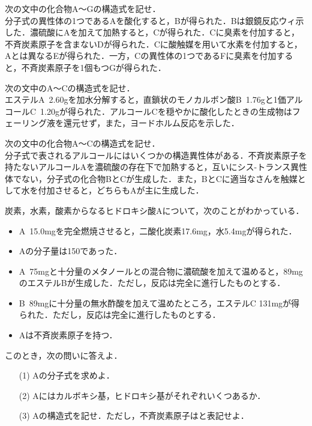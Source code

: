 \documentclass[a4paper,11pt]{ltjsarticle}
\begin{document}
\begin{que}
次の文中の化合物A〜Gの構造式を記せ．\\[8pt]
分子式の異性体の1つであるAを酸化すると，Bが得られた．Bは銀鏡反応ウィ示した．濃硫酸にAを加えて加熱すると，Cが得られた．Cに臭素を付加すると，不斉炭素原子を含まないDが得られた．Cに酸触媒を用いて水素を付加すると，Aとは異なるEが得られた．一方，Cの異性体の1つであるFに臭素を付加すると，不斉炭素原子を1個もつGが得られた．
\end{que}
\newpage
\begin{que}
    次の文中のA〜Cの構造式を記せ．\\[8pt]
エステルA~2.60gを加水分解すると，直鎖状のモノカルボン酸B~1.76gと1価アルコールC~1.20gが得られた．アルコールCを穏やかに酸化したときの生成物はフェーリング液を還元せず，また，ヨードホルム反応を示した．
\end{que}
\newpage
\begin{que}
次の文中の化合物A〜Cの構造式を記せ．\\[8pt]
分子式で表されるアルコールにはいくつかの構造異性体がある．不斉炭素原子を持たないアルコールAを濃硫酸の存在下で加熱すると，互いにシス-トランス異性体でない，分子式の化合物BとCが生成した．また，BとCに適当なさんを触媒として水を付加させると，どちらもAが主に生成した．
\end{que}
\newpage
\begin{que}
炭素，水素，酸素からなるヒドロキシ酸Aについて，次のことがわかっている．\begin{itemize}
    \item A~15.0mgを完全燃焼させると，二酸化炭素17.6mg，水5.4mgが得られた．
    \item Aの分子量は150であった．
    \item A~75mgと十分量のメタノールとの混合物に濃硫酸を加えて温めると，89mgのエステルBが生成した．ただし，反応は完全に進行したものとする．
    \item B~89mgに十分量の無水酢酸を加えて温めたところ，エステルC 131mgが得られた．ただし，反応は完全に進行したものとする．
    \item Aは不斉炭素原子を持つ．
\end{itemize}
このとき，次の問いに答えよ．
\begin{itemize}
    \item [(1)]Aの分子式を求めよ．
    \item [(2)]Aにはカルボキシ基，ヒドロキシ基がそれぞれいくつあるか．
    \item [(3)]Aの構造式を記せ．ただし，不斉炭素原子はと表記せよ．
\end{itemize}
\end{que}
\end{document}
